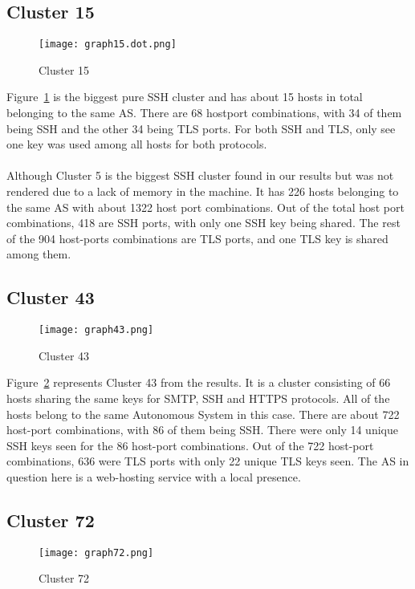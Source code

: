 \subsection{Cluster 15}
\begin{figure}[h!]
    \centering
    \texttt{[image: graph15.dot.png]}
    \caption{Cluster 15}
    \label{fig:cluster15}
\end{figure}
\noindent Figure~\ref*{fig:cluster15} is the biggest pure SSH cluster and has about 15 hosts in total belonging to the same AS. There are
68 hostport combinations, with 34 of them being SSH and the other 34 being TLS ports. For both SSH and TLS,  only see one key was  
used among all hosts for both protocols.\\\\
\noindent Although Cluster 5 is the biggest SSH cluster found in our results but was not rendered due to a lack of memory in the machine. 
It has 226 hosts belonging to the same AS with about 1322 host port combinations. Out of the total host port combinations, 418 are SSH ports, 
with only one SSH key being shared. The rest of the 904 host-ports combinations are TLS ports, and one TLS key is shared among them.
\pagebreak

\subsection{Cluster 43}
\begin{figure}[h!]
    \centering
    \texttt{[image: graph43.png]}
    \caption{Cluster 43}
    \label{fig:cluster43}
\end{figure}

\noindent Figure~\ref{fig:cluster43} represents Cluster 43 from the results. It is a cluster consisting of 66 hosts sharing the same keys for SMTP, SSH and HTTPS protocols. 
All of the hosts belong to the same Autonomous System in this case. There are about 722 host-port combinations, with 86 of them being SSH. There were only 14 unique SSH keys seen for the 86 host-port combinations. Out of the 722 host-port combinations, 636 
were TLS ports with only 22 unique TLS keys seen. The AS in question here is a web-hosting service with a local presence. 
\pagebreak

\subsection{Cluster 72}
\begin{figure}[h!]
    \centering
    \texttt{[image: graph72.png]}
    \caption{Cluster 72}
    \label{fig:cluster72}
\end{figure}

